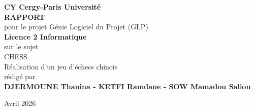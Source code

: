 
\begin{titlepage}{
    \begin{center}
        \vspace*{25mm}
        {\Large \textbf{CY Cergy-Paris Université}} \\
        \vspace*{10mm}
        {\Large \textbf{RAPPORT}} \\
        \vspace*{10mm}
        pour le projet Génie Logiciel du Projet (GLP) \\
        \textbf{Licence 2 Informatique} \\
        \vspace*{10mm}
        sur le sujet \\
        \vspace*{10mm}
        {\Huge \textsf{CHESS}} \\
        \vspace*{4mm}
        {\Huge \textsf{Réalisation d'un jeu d'échecs chinois}} \\
        \vspace*{10mm}
        rédigé par \\
        \vspace*{10mm}
        {\Large \textbf{DJERMOUNE Thanina - KETFI Ramdane - SOW Mamadou Saliou}} \\
        \vspace*{10mm}
        \date AAvril 2026
        \vspace*{10mm}
    \end{center}
}
\end{titlepage}
